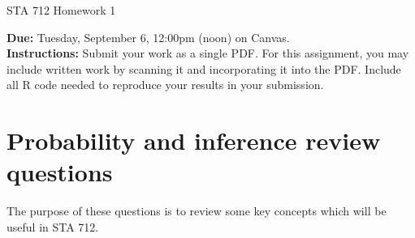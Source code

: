 \documentclass[11pt]{article}
\begin{document}
\begin{center}
\Large
STA 712 Homework 1\\
\normalsize
\vspace{5mm}
\end{center}

\noindent \textbf{Due:} Tuesday, September 6, 12:00pm (noon) on Canvas.\\ 

\noindent \textbf{Instructions:} Submit your work as a single PDF. For this assignment, you may include written work by scanning it and incorporating it into the PDF. Include all R code needed to reproduce your results in your submission.

\section*{Probability and inference review questions}

The purpose of these questions is to review some key concepts which will be useful in STA 712.
\end{document}
